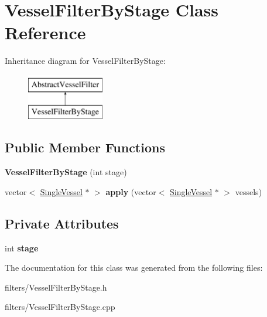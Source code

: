 \hypertarget{class_vessel_filter_by_stage}{}\section{Vessel\+Filter\+By\+Stage Class Reference}
\label{class_vessel_filter_by_stage}
Inheritance diagram for Vessel\+Filter\+By\+Stage\+:\begin{figure}[H]
\begin{center}
\leavevmode
\includegraphics[height=2.000000cm]{dc/df0/class_vessel_filter_by_stage}
\end{center}
\end{figure}
\subsection*{Public Member Functions}
\begin{DoxyCompactItemize}
\item 
{\bfseries Vessel\+Filter\+By\+Stage} (int stage)\hypertarget{class_vessel_filter_by_stage_aa51b761ba5901792962fc598c73d68c3}{}\label{class_vessel_filter_by_stage_aa51b761ba5901792962fc598c73d68c3}

\item 
vector$<$ \hyperlink{class_single_vessel}{Single\+Vessel} $\ast$ $>$ {\bfseries apply} (vector$<$ \hyperlink{class_single_vessel}{Single\+Vessel} $\ast$ $>$ vessels)\hypertarget{class_vessel_filter_by_stage_a5445fc34bc3241dac1e844e394b88c55}{}\label{class_vessel_filter_by_stage_a5445fc34bc3241dac1e844e394b88c55}

\end{DoxyCompactItemize}
\subsection*{Private Attributes}
\begin{DoxyCompactItemize}
\item 
int {\bfseries stage}\hypertarget{class_vessel_filter_by_stage_abef7762212e101783828d06422aa3314}{}\label{class_vessel_filter_by_stage_abef7762212e101783828d06422aa3314}

\end{DoxyCompactItemize}


The documentation for this class was generated from the following files\+:\begin{DoxyCompactItemize}
\item 
filters/Vessel\+Filter\+By\+Stage.\+h\item 
filters/Vessel\+Filter\+By\+Stage.\+cpp\end{DoxyCompactItemize}
